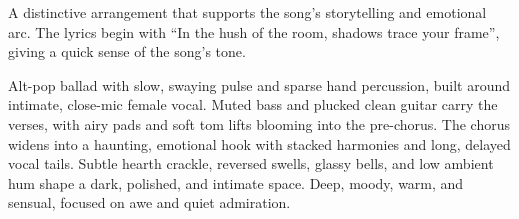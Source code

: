 

\begin{notes}
A distinctive arrangement that supports the song's storytelling and emotional arc. %
The lyrics begin with “In the hush of the room, shadows trace your frame”, giving a quick sense of the song’s tone.
\end{notes}

\begin{style}
Alt-pop ballad with slow, swaying pulse and sparse hand percussion, built around intimate, close-mic female vocal. %
Muted bass and plucked clean guitar carry the verses, with airy pads and soft tom lifts blooming into the pre-chorus. %
The chorus widens into a haunting, emotional hook with stacked harmonies and long, delayed vocal tails. %
Subtle hearth crackle, reversed swells, glassy bells, and low ambient hum shape a dark, polished, and intimate space. %
Deep, moody, warm, and sensual, focused on awe and quiet admiration.
\end{style}

